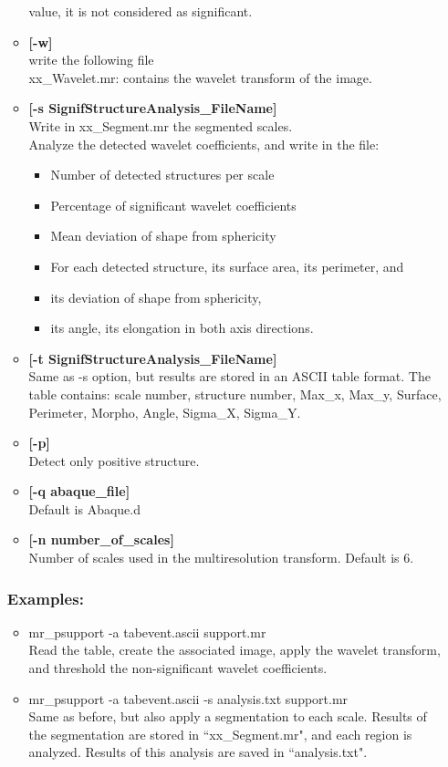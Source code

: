 \begin{itemize}
\begin{itemize}
value, it is not considered as significant.
\item {\bf [-w]}  \\
write the following file \\
xx\_Wavelet.mr: contains the wavelet transform of the image.
\item {\bf [-s SignifStructureAnalysis\_FileName]} \\
Write in xx\_Segment.mr the segmented scales. \\
Analyze the detected wavelet coefficients, and write in the file:
\begin{itemize}
\baselineskip=0.4truecm
\item Number of detected structures per scale
\item Percentage of significant wavelet coefficients
\item Mean deviation of shape from sphericity
\item For each detected structure, its surface area, its perimeter, and
\item its deviation of shape from sphericity, 
\item its angle, its elongation in both axis directions.
\end{itemize}
\item {\bf [-t SignifStructureAnalysis\_FileName]} \\
Same as -s option, but results are stored in an ASCII table format.
The table contains: scale number, structure number, 
Max\_x, Max\_y, Surface, Perimeter, Morpho, Angle, Sigma\_X, Sigma\_Y. 
\item {\bf [-p]}  \\
Detect only positive structure.
\item {\bf [-q abaque\_file]}  \\
Default is Abaque.d
\item {\bf [-n number\_of\_scales]}  \\
Number of scales used in the multiresolution transform.
Default is 6.
\end{itemize}
\subsubsection*{Examples:}
\begin{itemize}
\item mr\_psupport -a tabevent.ascii support.mr\\
Read the table, create the associated image, apply the wavelet
transform, and threshold the non-significant wavelet coefficients.
\item mr\_psupport -a tabevent.ascii -s analysis.txt support.mr\\ 
Same as before, but also apply a segmentation to each scale. Results
of the segmentation are stored in ``xx\_Segment.mr", and each region is
analyzed. Results of this analysis are saved in ``analysis.txt".
\end{itemize}



\end{itemize}
